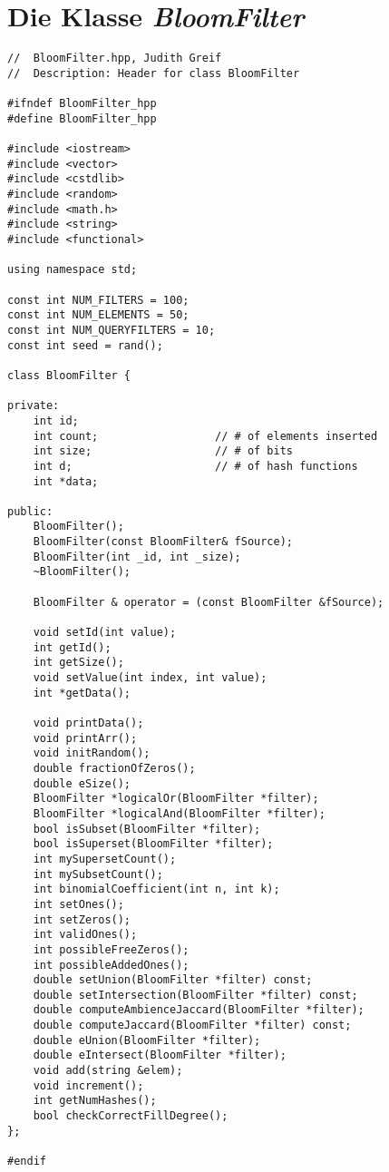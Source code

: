 \section{Die Klasse \textit{BloomFilter}}\label{sec:BloomFilter.hpp}
\small{
\begin{verbatim}
//  BloomFilter.hpp, Judith Greif
//  Description: Header for class BloomFilter

#ifndef BloomFilter_hpp
#define BloomFilter_hpp

#include <iostream>
#include <vector>
#include <cstdlib>
#include <random>
#include <math.h>
#include <string>
#include <functional>

using namespace std;

const int NUM_FILTERS = 100;
const int NUM_ELEMENTS = 50;
const int NUM_QUERYFILTERS = 10;
const int seed = rand();

class BloomFilter {
    
private:
    int id;
    int count;                  // # of elements inserted
    int size;                   // # of bits
    int d;                      // # of hash functions
    int *data;
    
public:
    BloomFilter();
    BloomFilter(const BloomFilter& fSource);
    BloomFilter(int _id, int _size);
    ~BloomFilter();
    
    BloomFilter & operator = (const BloomFilter &fSource);
    
    void setId(int value);
    int getId();
    int getSize();
    void setValue(int index, int value);
    int *getData();
    
    void printData();
    void printArr();
    void initRandom();
    double fractionOfZeros();
    double eSize();
    BloomFilter *logicalOr(BloomFilter *filter);
    BloomFilter *logicalAnd(BloomFilter *filter);
    bool isSubset(BloomFilter *filter);
    bool isSuperset(BloomFilter *filter);
    int mySupersetCount();
    int mySubsetCount();
    int binomialCoefficient(int n, int k);
    int setOnes();
    int setZeros();
    int validOnes();
    int possibleFreeZeros();
    int possibleAddedOnes();
    double setUnion(BloomFilter *filter) const;
    double setIntersection(BloomFilter *filter) const;
    double computeAmbienceJaccard(BloomFilter *filter);
    double computeJaccard(BloomFilter *filter) const;
    double eUnion(BloomFilter *filter);
    double eIntersect(BloomFilter *filter);
    void add(string &elem);
    void increment();
    int getNumHashes();
    bool checkCorrectFillDegree();
};

#endif
\end{verbatim}
}